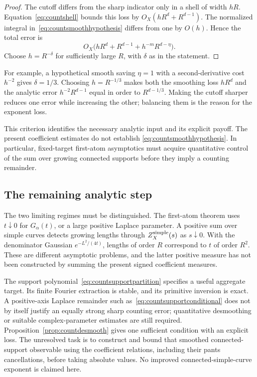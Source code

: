 \begin{proof}
The cutoff differs from the sharp indicator only in a shell of
width $h R$.  Equation~\eqref{eq:countshell} bounds this
loss by $O_X(h R^d+R^{d-1})$.  The normalized integral
in~\eqref{eq:countsmoothhypothesis} differs from one by
$O(h)$.  Hence the total error is
\[
 O_X\bigl(h R^d+R^{d-1}
                   +h^{-m}R^{d-\eta}\bigr).
\]
Choose $h=R^{-\delta}$ for sufficiently large $R$, with $\delta$ as in the statement.
\end{proof}

For example, a hypothetical smooth saving $\eta=1$ with a
second-derivative cost $h^{-2}$ gives $\delta=1/3$.
Choosing $h=R^{-1/3}$ makes both the smoothing loss $hR^d$
and the analytic error $h^{-2}R^{d-1}$ equal in order to
$R^{d-1/3}$. Making the cutoff sharper reduces one error while
increasing the other; balancing them is the reason for the exponent loss.

This criterion identifies the necessary analytic input and its
explicit payoff.  The present coefficient estimates do not establish
\eqref{eq:countsmoothhypothesis}.  In particular, fixed-target
first-atom asymptotics must acquire quantitative control of the
sum over growing connected supports before they imply a counting
remainder.

\subsection{The remaining analytic step}

The two limiting regimes must be distinguished. The first-atom theorem
uses $t\downarrow0$ for $G_\alpha(t)$, or a large positive Laplace
parameter. A positive sum over simple curves detects growing lengths
through $Z_X^{\rm simple}(s)$ as $s\downarrow0$. With the denominator
Gaussian $e^{-L^2/(4t)}$, lengths of order $R$ correspond to $t$ of
order $R^2$. These are different asymptotic problems, and the latter
positive measure has not been constructed by summing the present signed
coefficient measures.

The support polynomial~\eqref{eq:countsupportpartition} specifies a
useful aggregate target. Its finite Fourier extraction is stable, and
its primitive inversion is exact. A positive-axis Laplace remainder
such as~\eqref{eq:countsupportconditional} does not by itself justify
an equally strong sharp counting error; quantitative desmoothing or
suitable complex-parameter estimates are still required.
Proposition~\ref{prop:countdesmooth} gives one sufficient condition
with an explicit loss. The unresolved task is to construct and bound
that smoothed connected-support observable using the coefficient
relations, including their pants cancellations, before taking absolute
values. No improved connected-simple-curve exponent is claimed here.


\clearpage
